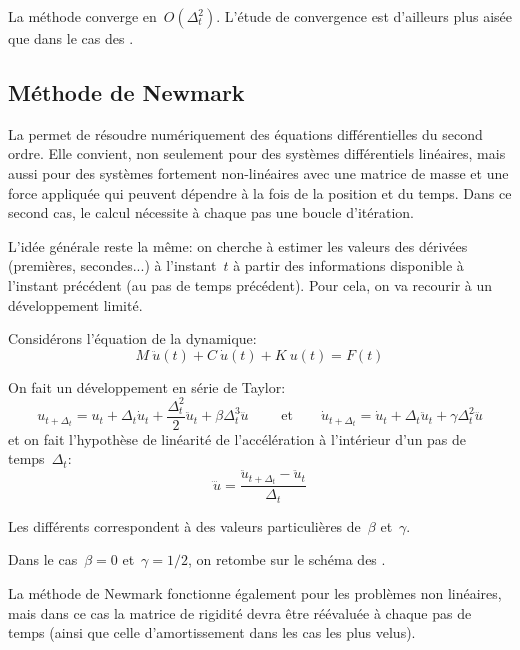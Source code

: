 \medskip
La méthode converge en~$O(\Delta_t^2)$.
L'étude de convergence est d'ailleurs plus aisée que dans le cas des .



\medskip
\subsection{Méthode de Newmark}\label{Sec-Newmark}

La  permet de résoudre numériquement des équations différentielles du 
second ordre. 
Elle convient, non seulement pour des systèmes différentiels linéaires, mais aussi pour 
des systèmes fortement non-linéaires avec une matrice de masse et une force appliquée 
qui peuvent dépendre à la fois de la position et du temps. 
Dans ce second cas, le calcul nécessite à chaque pas une boucle d'itération.

\medskip
L'idée générale reste la même: on cherche à estimer les valeurs des
dérivées (premières, secondes...) à l'instant~$t$ à partir des informations
disponible à l'instant précédent (au pas de temps précédent).
Pour cela, on va recourir à un développement limité.

\medskip
Considérons l'équation de la dynamique:
\begin{equation} M\ \ddot u(t) + C\ \dot u(t) + K\ u(t)= F(t) \end{equation}

On fait un développement en série de Taylor:
\begin{equation}u_{t+\Delta_t}=u_t+\Delta_t \dot{u}_t+\frac{\Delta_t^2}2\ddot{u}_t+\beta\Delta_t^3\dddot{u}
\qquad\text{ et}\qquad
\dot{u}_{t+\Delta_t} = \dot{u}_t+\Delta_t\ddot{u}_t+\gamma\Delta_t^2\dddot{u}
\end{equation}
et on fait l'hypothèse de linéarité de l'accélération à l'intérieur d'un pas
de temps~$\Delta_t$:
\begin{equation}\dddot{u}=\dfrac{\ddot{u}_{t+\Delta_t}-\ddot{u}_t}{\Delta_t}\end{equation}

\medskip
Les différents  correspondent à des valeurs particulières
de~$\beta$ et~$\gamma$.

Dans le cas~$\beta=0$ et~$\gamma=1/2$, on retombe sur le schéma des .

\medskip
La méthode de Newmark fonctionne également pour les problèmes non linéaires,
mais dans ce cas la matrice de rigidité devra être réévaluée à chaque
pas de temps (ainsi que celle d'amortissement dans les cas les plus velus).


